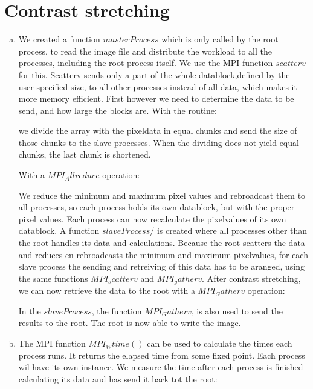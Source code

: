 \documentclass[a4paper]{article}
\begin{document}
\section{Contrast stretching}
\begin{enumerate} [(a)]
	\item We created a function $masterProcess$ which is only called by the root process, to read the image file and distribute the workload to all the processes, including the root process itself. We use the MPI function $scatterv$ 
	for this. Scatterv sends only a part of the whole datablock,defined by the user-specified size, to all other processes instead of all data, which makes it more memory efficient. First however we need to determine the data to be send, and how large the blocks are. With the routine:
	
	we divide the array with the pixeldata in equal chunks and send the size of those chunks to the slave processes. When the dividing does not yield equal chunks, the last chunk is shortened.
 
	With a $MPI_Allreduce$ operation:
	
	We reduce the minimum and maximum pixel values and rebroadcast them to all processes, so each process holds its own datablock, but with the proper pixel values. Each process can now recalculate the pixelvalues of its own datablock.
	A function $slaveProcess/$ is created where all processes other than the root handles its data and calculations. Because the root scatters the data and reduces en rebroadcasts the minimum and maximum pixelvalues, for each slave process the sending and retreiving of this data has to be aranged, using the same functions $MPI_scatterv$ and $MPI_gatherv$. After contrast stretching, we can now retrieve the data to the root with a $MPI_Gatherv$ operation:
	 
	In the $slaveProcess$, the function $MPI_Gatherv$, is also used to send the results to the root. The root is now able to write the image.
	 \item The MPI function $MPI_Wtime()$ can be used to calculate the times each process runs. It returns the elapsed time from some fixed point. Each process wil have its own instance. We measure the time after each process is finished calculating its data and has send it back tot the root: 
	 
	

\end{enumerate}
\end{document}
